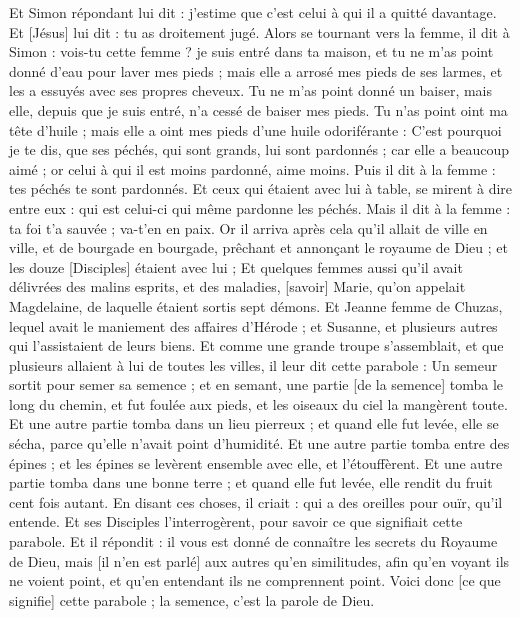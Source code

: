 \begin{multicols}{2}
Et Simon répondant lui dit : j'estime que c'est celui à qui il a quitté davantage. Et [Jésus] lui dit : tu as droitement jugé.
Alors se tournant vers la femme, il dit à Simon : vois-tu cette femme ? je suis entré dans ta maison, et tu ne m'as point donné d'eau pour laver mes pieds ; mais elle a arrosé mes pieds de ses larmes, et les a essuyés avec ses propres cheveux.
Tu ne m'as point donné un baiser, mais elle, depuis que je suis entré, n'a cessé de baiser mes pieds.
Tu n'as point oint ma tête d'huile ; mais elle a oint mes pieds d'une huile odoriférante :
C'est pourquoi je te dis, que ses péchés, qui sont grands, lui sont pardonnés ; car elle a beaucoup aimé ; or celui à qui il est moins pardonné, aime moins.
Puis il dit à la femme : tes péchés te sont pardonnés.
Et ceux qui étaient avec lui à table, se mirent à dire entre eux : qui est celui-ci qui même pardonne les péchés.
Mais il dit à la femme : ta foi t'a sauvée ; va-t'en en paix.
\VerseOne{}Or il arriva après cela qu'il allait de ville en ville, et de bourgade en bourgade, prêchant et annonçant le royaume de Dieu ; et les douze [Disciples] étaient avec lui ;
Et quelques femmes aussi qu'il avait délivrées des malins esprits, et des maladies, [savoir] Marie, qu'on appelait Magdelaine, de laquelle étaient sortis sept démons.
Et Jeanne femme de Chuzas, lequel avait le maniement des affaires d'Hérode ; et Susanne, et plusieurs autres qui l'assistaient de leurs biens.
Et comme une grande troupe s'assemblait, et que plusieurs allaient à lui de toutes les villes, il leur dit cette parabole :
Un semeur sortit pour semer sa semence ; et en semant, une partie [de la semence] tomba le long du chemin, et fut foulée aux pieds, et les oiseaux du ciel la mangèrent toute.
Et une autre partie tomba dans un lieu pierreux ; et quand elle fut levée, elle se sécha, parce qu'elle n'avait point d'humidité.
Et une autre partie tomba entre des épines ; et les épines se levèrent ensemble avec elle, et l'étouffèrent.
Et une autre partie tomba dans une bonne terre ; et quand elle fut levée, elle rendit du fruit cent fois autant. En disant ces choses, il criait : qui a des oreilles pour ouïr, qu'il entende.
Et ses Disciples l'interrogèrent, pour savoir ce que signifiait cette parabole.
Et il répondit : il vous est donné de connaître les secrets du Royaume de Dieu, mais [il n'en est parlé] aux autres qu'en similitudes, afin qu'en voyant ils ne voient point, et qu'en entendant ils ne comprennent point.
Voici donc [ce que signifie] cette parabole ; la semence, c'est la parole de Dieu.

\end{multicols}

